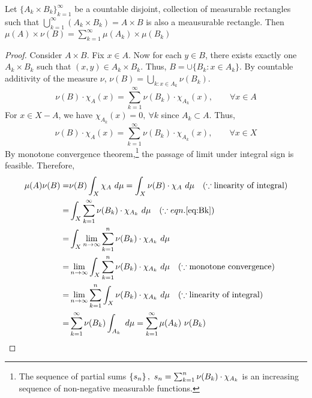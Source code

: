 \begin{lemma}
	Let $\{ A_k \times B_k \}_{k=1}^\infty$ be a countable disjoint, collection of measurable rectangles such that $\displaystyle \bigcup_{k=1}^\infty \left( A_k \times B_k \right) = A \times B$ is also a meausurable rectangle.
	Then
	$\displaystyle \mu(A) \times \nu(B) = \sum_{k=1}^\infty \mu(A_k) \times \mu(B_k) $
\end{lemma}
\begin{proof}
	Consider $A \times B$.
	Fix $x \in A$.
	Now for each $y \in B$, there exists exactly one $A_k \times B_k$ such that $(x,y) \in A_k \times B_k$.
	Thus, $B = \cup\{B_k : x \in A_k\}$.
	By countable additivity of the measure $\nu$, $\displaystyle \nu(B) = \bigcup_{k : x \in A_k} \nu(B_k)$.
	\begin{equation*}
		\nu(B) \cdot \chi_A(x) = \sum_{k=1}^\infty \nu(B_k) \cdot \chi_{A_k}(x),\qquad \forall x \in A
	\end{equation*}
	For $x \in X-A$, we have $\chi_{A_k}(x) = 0,\ \forall k$ since $A_k \subset A$.
	Thus,
	\begin{equation}
		\nu(B) \cdot \chi_A(x) = \sum_{k=1}^\infty \nu(B_k) \cdot \chi_{A_k}(x),\qquad \forall x \in X
		\label{eq:Bk}
	\end{equation}
	By monotone convergence theorem,\footnote{The sequence of partial sums  $\left\{s_n\right\},\ s_n = \sum_{k=1}^n \nu(B_k) \cdot \chi_{A_k}$ is an increasing sequence of non-negative measurable functions.} the passage of limit under integral sign is feasible.
	Therefore,
	\begin{align*}
		\mu(A) \nu(B) 
		= & \nu(B) \int_X \chi_A \ d\mu
		= \int_X \nu(B) \cdot \chi_A \ d\mu \quad (\because \text{linearity of integral}) \\
		= & \int_X \sum_{k=1}^\infty \nu(B_k) \cdot \chi_{A_k} \ d\mu \quad (\because eqn. \ref{eq:Bk}) \\
		= & \int_X \lim_{n \to \infty} \sum_{k=1}^n \nu(B_k) \cdot \chi_{A_k} \ d\mu \\
		= & \lim_{n \to \infty} \int_X \sum_{k=1}^n \nu(B_k) \cdot \chi_{A_k} \ d\mu \quad (\because \text{monotone convergence})\\
		= & \lim_{n \to \infty} \sum_{k=1}^n \int_X  \nu(B_k) \cdot \chi_{A_k} \ d\mu \quad (\because \text{linearity of integral})\\
		= & \sum_{k=1}^\infty \nu(B_k) \int_{A_k}\ d\mu 
		= \sum_{k=1}^\infty \mu(A_k)\ \nu(B_k)
	\end{align*}
\end{proof}

